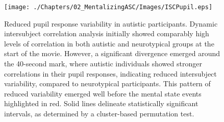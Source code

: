 \begin{figure}[!ht]
    \vspace*{5pt}
	\centering
    \texttt{[image: ./Chapters/02\_MentalizingASC/Images/ISCPupil.eps]}
	\caption{Reduced pupil response variability in autistic participants. Dynamic intersubject correlation analysis initially showed comparably high levels of correlation in both autistic and neurotypical groups at the start of the movie. However, a significant divergence emerged around the 40-second mark, where autistic individuals showed stronger correlations in their pupil responses, indicating reduced intersubject variability, compared to neurotypical participants. This pattern of reduced variability emerged well before the mental state events highlighted in red. Solid lines delineate statistically significant intervals, as determined by a cluster-based permutation test.}
    \vspace*{-15pt}
	\label{fig:isc-pupil}
\end{figure}



